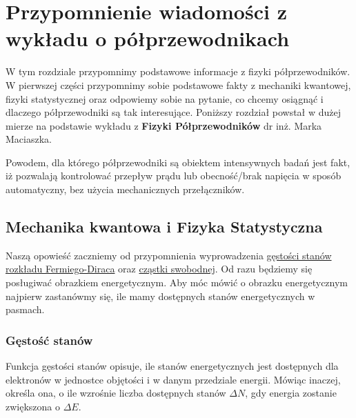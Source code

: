 \chapter{Przypomnienie wiadomości z wykładu o półprzewodnikach}
W tym rozdziale przypomnimy podstawowe informacje z fizyki półprzewodników. W pierwszej części przypomnimy sobie podstawowe fakty 
z mechaniki kwantowej, fizyki statystycznej oraz odpowiemy sobie na pytanie, co chcemy osiągnąć i dlaczego półprzewodniki są tak interesujące. 
\newline\newline
\noindent Poniższy rozdział powstał w dużej mierze na podstawie wykładu z \textbf{Fizyki Półprzewodników} dr inż. Marka Maciaszka. 
\newline\newline

\noindent Powodem, dla którego półprzewodniki są obiektem intensywnych badań jest fakt, iż pozwalają kontrolować przepływ prądu lub obecność/brak napięcia 
w sposób automatyczny, bez użycia mechanicznych przełączników. 

\section{Mechanika kwantowa i Fizyka Statystyczna}
    Naszą opowieść zaczniemy od przypomnienia wyprowadzenia \hyperlink{\ref{sec: DOS}}{gęstości stanów} 
    \hyperlink{\ref{sec: F-D}}{rozkładu Fermiego-Diraca} oraz \hyperlink{\ref{sec: free particle}}{cząstki swobodnej}. Od razu będziemy się 
    posługiwać obrazkiem energetycznym. Aby móc mówić o obrazku energetycznym najpierw zastanówmy się, ile mamy dostępnych stanów energetycznych w pasmach.

    \subsection{Gęstość stanów} \label{sec: DOS}
        Funkcja gęstości stanów opisuje, ile stanów energetycznych jest dostępnych dla elektronów w jednostce objętości i w danym przedziale energii. 
        Mówiąc inaczej, określa ona, o ile wzrośnie liczba dostępnych stanów $\Delta N$, gdy energia zostanie zwiększona o $\Delta E$. 

